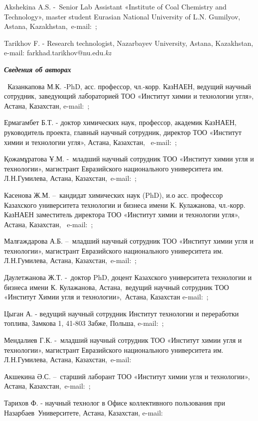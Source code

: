 Akshekina A.S. -~Senior Lab Assistant «Institute of Coal Chemistry and
Technology», master student Eurasian National University of L.N.
Gumilyov, Astana,
Kazakhstan,~e-mail:~\href{https://e.mail.ru/compose/?mailto=mailto\%3aakshekina11@gmail.com}{};

Tarikhov F. - Research technologist, Nazarbayev University, Astana,
Kazakhstan, e-mail: farkhad.tarikhov@nu.edu.\emph{kz}

\emph{{\bfseries Сведения об авторах}}

\emph{~}Казанкапова М.К. -PhD, асс. профессор, чл.-корр. КазНАЕН,
ведущий научный сотрудник, заведующий лабораторией ТОО «Институт химии и
технологии угля», Астана, Казахстан,
e-mail:~\href{https://e.mail.ru/compose/?mailto=mailto\%3amaira_1986@mail.ru}{};

Ермагамбет Б.Т. - доктор химических наук, профессор, академик КазНАЕН,
руководитель проекта, главный научный сотрудник, директор ТОО «Институт
химии и технологии угля», Астана, Казахстан,~
e-mail:~\href{https://e.mail.ru/compose/?mailto=mailto\%3abake.yer@mail.ru}{};

Қожамұратова Ұ.М. -~младший научный сотрудник ТОО «Институт химии угля и
технологии», магистрант Евразийского национального университета им.
Л.Н.Гумилева, Астана,
Казахстан,~e-mail:~\href{https://e.mail.ru/compose/?mailto=mailto\%3akozhamuratova.u@mail.ru}{};

Касенова Ж.М. --~кандидат химических наук (PhD), и.о асс. профессор
Казахского университета технологии и бизнеса имени К. Кулажанова,
чл.-корр. КазНАЕН заместитель директора ТОО «Институт химии и технологии
угля», Астана, Казахстан,~
e-mail:~\href{https://e.mail.ru/compose/?mailto=mailto\%3azhanar_k_68@mail.ru}{};

Малғаждарова А.Б. --~младший научный сотрудник ТОО «Институт химии угля
и технологии», магистрант Евразийского национального университета им.
Л.Н.Гумилева, Астана,
Казахстан,~e-mail:~\href{https://e.mail.ru/compose/?mailto=mailto\%3amalgazhdarova.ab@mail.ru}{};

Даулетжанова Ж.Т. -~доктор PhD, доцент Казахского университета
технологии и бизнеса имени К. Кулажанова, Астана,~ведущий научный
сотрудник ТОО «Институт Химии угля и технологии»,~Астана, Казахстан
e-mail:~\href{https://e.mail.ru/compose/?mailto=mailto\%3akaliyeva_zhanna@mail.ru}{};

Цыган А. - ведущий научный сотрудник Институт технологии и переработки
топлива, Замкова 1, 41-803 Забже, Польша,
e-mail:~\href{mailto:acygan@itpe.pl}{};

Мендалиев Г.К. -~младший научный сотрудник ТОО «Институт химии угля и
технологии», магистрант Евразийского национального университета им.
Л.Н.Гумилева, Астана,
Казахстан,~e-mail:~\href{https://e.mail.ru/compose/?mailto=mailto\%3aganimen02@mail.ru}{}

Акшекина Ә.С. --~старший лаборант ТОО «Институт химии угля и
технологии», Астана,
Казахстан,~e-mail:~\href{https://e.mail.ru/compose/?mailto=mailto\%3aakshekina11@gmail.com}{};

Тарихов Ф. - научный технолог в Офисе коллективного пользования при
Назарбаев~Университете, Астана, Казахстан, e-mail:
\href{mailto:farkhad.tarikhov@nu.edu.kz}{}

\emph{~}